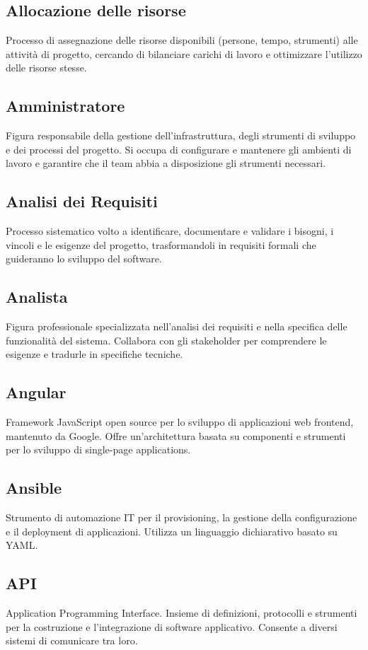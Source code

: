 \documentclass[a4paper,11pt]{article}
\begin{document}
\subsection{Allocazione delle risorse}
Processo di assegnazione delle risorse disponibili (persone, tempo, strumenti) alle attività di progetto, cercando di bilanciare carichi di lavoro e ottimizzare l'utilizzo delle risorse stesse.

\subsection{Amministratore}
Figura responsabile della gestione dell'infrastruttura, degli strumenti di sviluppo e dei processi del progetto. Si occupa di configurare e mantenere gli ambienti di lavoro e garantire che il team abbia a disposizione gli strumenti necessari.

\subsection{Analisi dei Requisiti}
Processo sistematico volto a identificare, documentare e validare i bisogni, i vincoli e le esigenze del progetto, trasformandoli in requisiti formali che guideranno lo sviluppo del software.

\subsection{Analista}
Figura professionale specializzata nell'analisi dei requisiti e nella specifica delle funzionalità del sistema. Collabora con gli stakeholder per comprendere le esigenze e tradurle in specifiche tecniche.

\subsection{Angular}
Framework JavaScript open source per lo sviluppo di applicazioni web frontend, mantenuto da Google. Offre un'architettura basata su componenti e strumenti per lo sviluppo di single-page applications.

\subsection{Ansible}
Strumento di automazione IT per il provisioning, la gestione della configurazione e il deployment di applicazioni. Utilizza un linguaggio dichiarativo basato su YAML.

\subsection{API}
Application Programming Interface. Insieme di definizioni, protocolli e strumenti per la costruzione e l'integrazione di software applicativo. Consente a diversi sistemi di comunicare tra loro.
\end{document}
